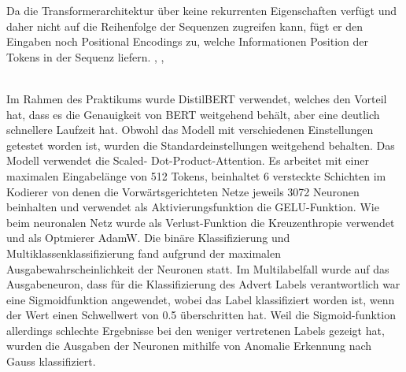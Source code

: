 Da die Transformerarchitektur über keine rekurrenten Eigenschaften verfügt und daher nicht auf die Reihenfolge der Sequenzen zugreifen kann, fügt er den Eingaben noch Positional Encodings zu, welche Informationen Position der Tokens in der Sequenz liefern. \cite{DBLP:journals/corr/abs-2012-15524}, \cite{DBLP:journals/corr/SennrichHB15}, \cite{6289079}


\\
Im Rahmen des Praktikums wurde DistilBERT \cite{Sanh2019} verwendet, welches den Vorteil hat, dass es die Genauigkeit von BERT weitgehend behält, aber eine deutlich schnellere Laufzeit hat. Obwohl das Modell mit verschiedenen Einstellungen getestet worden ist, wurden die Standardeinstellungen weitgehend behalten. Das Modell verwendet die Scaled- Dot-Product-Attention. Es arbeitet mit einer maximalen Eingabelänge von 512 Tokens, beinhaltet 6 versteckte Schichten im Kodierer von denen die Vorwärtsgerichteten Netze jeweils 3072 Neuronen beinhalten und verwendet als Aktivierungsfunktion die GELU-Funktion. \cite{Hendrycks2016} Wie beim neuronalen Netz wurde als Verlust-Funktion die Kreuzenthropie verwendet und als Optmierer AdamW. Die binäre Klassifizierung und Multiklassenklassifizierung fand aufgrund der maximalen Ausgabewahrscheinlichkeit der Neuronen statt. Im Multilabelfall wurde auf das Ausgabeneuron, dass für die Klassifizierung des Advert Labels verantwortlich war eine Sigmoidfunktion angewendet, wobei das Label klassifiziert worden ist, wenn der Wert einen Schwellwert von 0.5 überschritten hat. Weil die Sigmoid-funktion allerdings schlechte Ergebnisse bei den weniger vertretenen Labels gezeigt hat, wurden die Ausgaben der Neuronen mithilfe von Anomalie Erkennung nach Gauss \cite{GaussMashineLearning} klassifiziert.